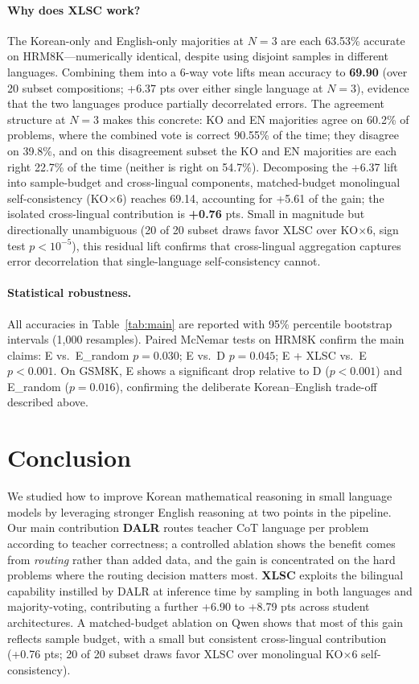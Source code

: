 \documentclass{article}
\begin{document}
\paragraph{Why does XLSC work?}
The Korean-only and English-only majorities at $N{=}3$ are each
63.53\% accurate on HRM8K---numerically identical, despite using
disjoint samples in different languages. Combining them into a
6-way vote lifts mean accuracy to \textbf{69.90} (over 20 subset
compositions; +6.37 pts over either single language at $N{=}3$),
evidence that the two languages produce partially decorrelated errors.
The agreement structure at $N{=}3$ makes this concrete: KO and EN
majorities agree on 60.2\% of problems, where the combined vote is
correct 90.55\% of the time; they disagree on 39.8\%, and on this
disagreement subset the KO and EN majorities are each right 22.7\%
of the time (neither is right on 54.7\%). Decomposing the +6.37 lift
into sample-budget and cross-lingual components, matched-budget
monolingual self-consistency (KO$\times$6) reaches 69.14, accounting
for +5.61 of the gain; the isolated cross-lingual contribution is
\textbf{+0.76} pts. Small in magnitude but directionally unambiguous
(20 of 20 subset draws favor XLSC over KO$\times$6, sign test
$p < 10^{-5}$), this residual lift confirms that cross-lingual
aggregation captures error decorrelation that single-language
self-consistency cannot.

\paragraph{Statistical robustness.}
All accuracies in Table~\ref{tab:main} are reported with 95\%
percentile bootstrap intervals (1,000 resamples). Paired McNemar
tests on HRM8K confirm the main claims:
E vs.\ E\_random $p=0.030$;
E vs.\ D $p=0.045$;
E + XLSC vs.\ E $p<0.001$.
On GSM8K, E shows a significant drop relative to D ($p<0.001$) and
E\_random ($p=0.016$), confirming the deliberate Korean--English
trade-off described above.

\section{Conclusion}
We studied how to improve Korean mathematical reasoning in small
language models by leveraging stronger English reasoning at two
points in the pipeline. Our main contribution \textbf{DALR} routes
teacher CoT language per problem according to teacher correctness;
a controlled ablation shows the benefit comes from \emph{routing}
rather than added data, and the gain is concentrated on the hard
problems where the routing decision matters most. \textbf{XLSC}
exploits the bilingual capability instilled by DALR at inference
time by sampling in both languages and majority-voting,
contributing a further +6.90 to +8.79 pts across student
architectures. A matched-budget ablation on Qwen shows that most of
this gain reflects sample budget, with a small but consistent
cross-lingual contribution (+0.76 pts; 20 of 20 subset draws favor
XLSC over monolingual KO$\times$6 self-consistency).
\end{document}
